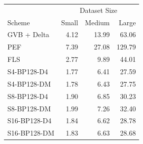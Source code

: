 \begin{tabular}{lrrr}
\toprule
 & \multicolumn{3}{c}{Dataset Size} \\
Scheme & Small & Medium & Large \\
\midrule
GVB + Delta & 4.12 & 13.99 & 63.06 \\
PEF & 7.39 & 27.08 & 129.79 \\
FLS & 2.77 & 9.89 & 44.01 \\
S4-BP128-D4 & 1.77 & 6.41 & 27.59 \\
S4-BP128-DM & 1.78 & 6.43 & 27.75 \\
S8-BP128-D4 & 1.90 & 6.85 & 30.23 \\
S8-BP128-DM & 1.99 & 7.26 & 32.40 \\
S16-BP128-D4 & 1.84 & 6.62 & 28.78 \\
S16-BP128-DM & 1.83 & 6.63 & 28.68 \\
\bottomrule
\end{tabular}
